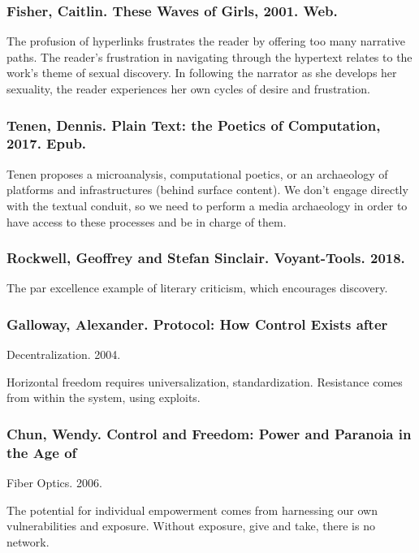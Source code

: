 \documentclass[11pt]{article}
\begin{document}
\subsubsection{Fisher, Caitlin. These Waves of Girls, 2001. Web.}
\label{sec:org719ccba}

The profusion of hyperlinks frustrates the reader by offering too many
narrative paths. The reader’s frustration in navigating through the
hypertext relates to the work’s theme of sexual discovery. In
following the narrator as she develops her sexuality, the reader
experiences her own cycles of desire and frustration.

\subsubsection{Tenen, Dennis. Plain Text: the Poetics of Computation, 2017. Epub.}
\label{sec:orgb8b0049}

Tenen proposes a microanalysis, computational poetics, or an
archaeology of platforms and infrastructures (behind surface
content). We don’t engage directly with the textual conduit, so we
need to perform a media archaeology in order to have access to these
processes and be in charge of them.

\subsubsection{Rockwell, Geoffrey and Stefan Sinclair. Voyant-Tools. 2018.}
\label{sec:org93b86f0}

The par excellence example of literary criticism, which encourages
discovery.

\subsubsection{Galloway, Alexander. Protocol: How Control Exists after}
\label{sec:org46be7a2}
Decentralization. 2004.

Horizontal freedom requires universalization,
standardization. Resistance comes from within the system, using
exploits.

\subsubsection{Chun, Wendy. Control and Freedom: Power and Paranoia in the Age of}
\label{sec:orgf96a956}
Fiber Optics. 2006.

The potential for individual empowerment comes from harnessing our own
vulnerabilities and exposure. Without exposure, give and take, there
is no network.
\end{document}
